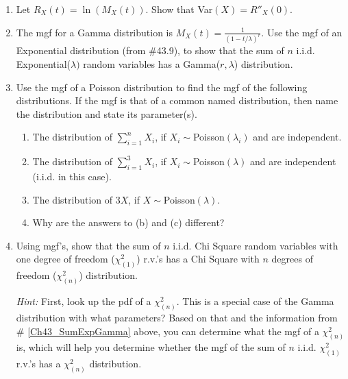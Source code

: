 \documentclass[12pt]{article}
\begin{document}
\begin{enumerate}
%




\item \label{Ch43_R_Var} Let $R_X(t)=\ln(M_X(t))$. Show that Var$(X)=R''_X(0)$.

\item \label{Ch43_SumExpGamma} The mgf for a Gamma distribution is $M_X(t)=\frac{1}{(1-t/\lambda)^r}$. Use the mgf of an Exponential distribution (from \#43.9), to show that the sum of $n$ i.i.d.  Exponential($\lambda)$ random variables has a Gamma($r,\lambda$) distribution.


\item \label{Ch43_SumPoisson} Use the mgf of a Poisson distribution to find the mgf of the following distributions. If the mgf is that of a common named distribution, then name the distribution and state its parameter(s).
\begin{enumerate}
\item The distribution of $\sum_{i=1}^nX_i$, if $X_i\sim$Poisson$(\lambda_i)$ and are independent.
\item The distribution of $\sum_{i=1}^3X_i$, if $X_i\sim$Poisson$(\lambda)$ and are independent (i.i.d. in this case).
\item The distribution of $3X$, if $X\sim$Poisson$(\lambda)$.
\item Why are the answers to (b) and (c) different?

\end{enumerate}

\item \label{Ch43_SumChiSquareOneDF} Using mgf's, show that the sum of $n$ i.i.d. Chi Square random variables with one degree of freedom ($\chi^2_{(1)}$) r.v.'s has a Chi Square with $n$ degrees of freedom ($\chi^2_{(n)}$) distribution. 

\emph{Hint:} First, look up the pdf of a $\chi^2_{(n)}$. This is a special case of the Gamma distribution with what parameters? Based on that and the information from \# \ref{Ch43_SumExpGamma} above, you can determine what the mgf of a $\chi^2_{(n)}$ is, which will help you determine whether the mgf of  the sum of $n$ i.i.d. $\chi^2_{(1)}$ r.v.'s has a $\chi^2_{(n)}$ distribution.




\end{enumerate}  %
\end{document}
